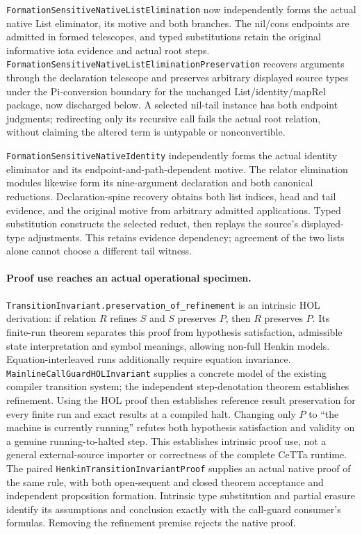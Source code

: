 \documentclass[11pt]{article}
\theoremstyle{definition}
\theoremstyle{remark}
\begin{document}
\nolinkurl{FormationSensitiveNativeListElimination} now independently forms
the actual native List eliminator, its motive and both branches. The nil/cons
endpoints are admitted in formed telescopes, and typed substitutions retain
the original informative iota evidence and actual root steps.
\nolinkurl{FormationSensitiveNativeListEliminationPreservation} recovers
arguments through the declaration telescope and preserves arbitrary displayed
source types under the Pi-conversion boundary for the unchanged
List/identity/mapRel package, now discharged below. A selected nil-tail
instance has both endpoint judgments; redirecting only its recursive call
fails the actual root relation, without claiming the altered term is untypable
or nonconvertible.

\nolinkurl{FormationSensitiveNativeIdentity} independently forms the actual
identity eliminator and its endpoint-and-path-dependent motive. The relator
elimination modules likewise form its nine-argument declaration and both
canonical reductions. Declaration-spine recovery obtains both list indices,
head and tail evidence, and the original motive from arbitrary admitted
applications. Typed substitution constructs the selected reduct, then replays
the source's displayed-type adjustments. This retains evidence dependency;
agreement of the two lists alone cannot choose a different tail witness.

\paragraph{Proof use reaches an actual operational specimen.}
\nolinkurl{TransitionInvariant.preservation_of_refinement} is an intrinsic
HOL derivation: if relation $R$ refines $S$ and $S$ preserves $P$, then $R$
preserves $P$. Its finite-run theorem separates this proof from hypothesis
satisfaction, admissible state interpretation and symbol meanings, allowing
non-full Henkin models. Equation-interleaved runs additionally require equation
invariance. \nolinkurl{MainlineCallGuardHOLInvariant} supplies a concrete model
of the existing compiler transition system; the independent step-denotation
theorem establishes refinement. Using the HOL proof then establishes reference
result preservation for every finite run and exact results at a compiled halt.
Changing only $P$ to ``the machine is currently running'' refutes both
hypothesis satisfaction and validity on a genuine running-to-halted step.
This establishes intrinsic proof use, not a general external-source importer
or correctness of the complete CeTTa runtime.
The paired \nolinkurl{HenkinTransitionInvariantProof} supplies an actual
native proof of the same rule, with both open-sequent and closed theorem
acceptance and independent proposition formation. Intrinsic type substitution
and partial erasure identify its assumptions and conclusion exactly with the
call-guard consumer's formulas. Removing the refinement premise rejects the
native proof.
\end{document}

